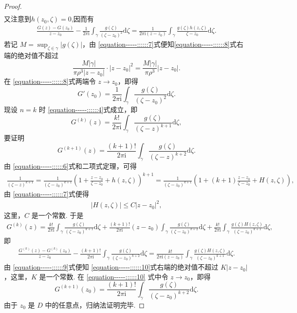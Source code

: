 \documentclass[../../main.tex]{subfiles}
\begin{document}
\begin{proof}
\begin{align*}
\end{align*}
又注意到$h(z_0,\zeta)=0$,因而有
\begin{align}
\frac{G(z) - G(z_0)}{z - z_0} - \frac{1}{2\pi \mathrm{i}} \int_{\gamma} \frac{g(\zeta)}{(\zeta - z_0)^2} \mathrm{d}\zeta  = \frac{1}{2\pi \mathrm{i} (z - z_0)} \int_{\gamma} \frac{g(\zeta)h(z, \zeta)}{\zeta - z_0} \mathrm{d}\zeta. \label{equation-----::::::8}
\end{align}
若记 \( M = \sup_{\zeta \in \gamma} |g(\zeta)| \)，由 \eqref{equation-----::::::7}式便知\eqref{equation-----::::::8}式右端的绝对值不超过
\[
\frac{M |\gamma|}{\pi \rho^3 |z - z_0|} \cdot |z - z_0|^2 = \frac{M |\gamma|}{\pi \rho^3} |z - z_0|.
\]
在 \eqref{equation-----::::::8}式两端令 \( z \to z_0 \)，即得
\[
G'(z_0) = \frac{1}{2\pi \mathrm{i}} \int_{\gamma} \frac{g(\zeta)}{(\zeta - z_0)^2} \mathrm{d}\zeta.
\]
现设 \( n = k \) 时 \eqref{equation-----::::::4}式成立，即
\[
G^{(k)}(z) = \frac{k!}{2\pi \mathrm{i}} \int_{\gamma} \frac{g(\zeta)}{(\zeta - z)^{k + 1}} \mathrm{d}\zeta,
\]
要证明
\[
G^{(k + 1)}(z) = \frac{(k + 1)!}{2\pi \mathrm{i}} \int_{\gamma} \frac{g(\zeta)}{(\zeta - z)^{k + 2}} \mathrm{d}\zeta.
\]
由 \eqref{equation-----::::::6}式和二项式定理，可得
\begin{align*}
\frac{1}{(\zeta - z)^{k + 1}} = \frac{1}{(\zeta - z_0)^{k + 1}} \left( 1 + \frac{z - z_0}{\zeta - z_0} + h(z, \zeta) \right)^{k + 1} = \frac{1}{(\zeta - z_0)^{k + 1}} \left( 1 + (k + 1) \frac{z - z_0}{\zeta - z_0} + H(z, \zeta) \right),
\end{align*}
由 \eqref{equation-----::::::7}式便得
\begin{align}
|H(z, \zeta)| \leqslant C |z - z_0|^2, \label{equation-----::::::9}
\end{align}
这里，\( C \) 是一个常数. 于是
\begin{align*}
G^{(k)}(z) = \frac{k!}{2\pi \mathrm{i}} \int_{\gamma} \frac{g(\zeta)}{(\zeta - z_0)^{k + 1}} \mathrm{d}\zeta + \frac{(k + 1)!}{2\pi \mathrm{i}} (z - z_0) \int_{\gamma} \frac{g(\zeta)}{(\zeta - z_0)^{k + 2}} \mathrm{d}\zeta + \frac{k!}{2\pi \mathrm{i}} \int_{\gamma} \frac{g(\zeta)H(z, \zeta)}{(\zeta - z_0)^{k + 1}} \mathrm{d}\zeta,
\end{align*}
即
\begin{align}
\frac{G^{(k)}(z) - G^{(k)}(z_0)}{z - z_0} - \frac{(k + 1)!}{2\pi \mathrm{i}} \int_{\gamma} \frac{g(\zeta)}{(\zeta - z_0)^{k + 2}} \mathrm{d}\zeta = \frac{k!}{2\pi \mathrm{i} (z - z_0)} \int_{\gamma} \frac{g(\zeta)H(z, \zeta)}{(\zeta - z_0)^{k + 1}} \mathrm{d}\zeta. \label{equation-----::::::10}
\end{align}
由 \eqref{equation-----::::::9}式便知 \eqref{equation-----::::::10}式右端的绝对值不超过 \( K |z - z_0| \)，这里，\( K \) 是一个常数. 在 \eqref{equation-----::::::10} 式中令 \( z \to z_0 \)，即得
\[
G^{(k + 1)}(z_0) = \frac{(k + 1)!}{2\pi \mathrm{i}} \int_{\gamma} \frac{g(\zeta)}{(\zeta - z_0)^{k + 2}} \mathrm{d}\zeta.
\]
由于 \( z_0 \) 是 \( D \) 中的任意点，归纳法证明完毕. 
\end{proof}
\end{document}
